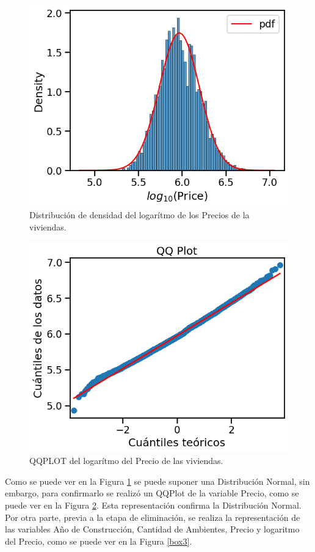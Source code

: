 \begin{figure} [!t]
\begin{center}
\includegraphics[width=0.7\columnwidth]{img/logprecio.png}
\caption{Distribución de densidad del logarítmo de los Precios de la viviendas.}
\label{Precios}
\end{center}
\end{figure}


\begin{figure} [!ht]
\begin{center}
\includegraphics[width=0.7\columnwidth]{img/qqpPrecio.png}
\caption{QQPLOT del logarítmo del Precio de las viviendas.}
\label{QQ}
\end{center}
\end{figure}

Como se puede ver en la Figura \ref{Precios} se puede suponer una Distribución Normal, sin embargo, para confirmarlo se realizó un QQPlot de la variable Precio, como se puede ver en la Figura \ref{QQ}. Esta representación confirma la Distribución Normal. Por otra parte, previa a la etapa de eliminación, se realiza la representación de las variables Año de Construcción, Cantidad de Ambientes, Precio y logaritmo del Precio, como se puede ver en la Figura \ref{box3}.


